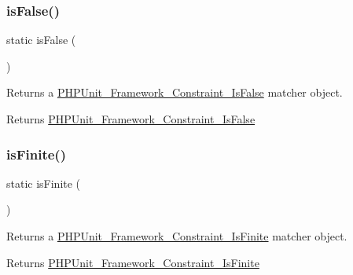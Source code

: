 \subsubsection{\texorpdfstring{is\+False()}{isFalse()}}
{\footnotesize\ttfamily static is\+False (\begin{DoxyParamCaption}{ }\end{DoxyParamCaption})\hspace{0.3cm}{\ttfamily [static]}}

Returns a \mbox{\hyperlink{class_p_h_p_unit___framework___constraint___is_false}{P\+H\+P\+Unit\+\_\+\+Framework\+\_\+\+Constraint\+\_\+\+Is\+False}} matcher object.

\begin{DoxyReturn}{Returns}
\mbox{\hyperlink{class_p_h_p_unit___framework___constraint___is_false}{P\+H\+P\+Unit\+\_\+\+Framework\+\_\+\+Constraint\+\_\+\+Is\+False}} 
\end{DoxyReturn}
\mbox{\label{class_p_h_p_unit___framework___assert_a991e411ffff9642316db83969d8ffc20}} 
\subsubsection{\texorpdfstring{is\+Finite()}{isFinite()}}
{\footnotesize\ttfamily static is\+Finite (\begin{DoxyParamCaption}{ }\end{DoxyParamCaption})\hspace{0.3cm}{\ttfamily [static]}}

Returns a \mbox{\hyperlink{class_p_h_p_unit___framework___constraint___is_finite}{P\+H\+P\+Unit\+\_\+\+Framework\+\_\+\+Constraint\+\_\+\+Is\+Finite}} matcher object.

\begin{DoxyReturn}{Returns}
\mbox{\hyperlink{class_p_h_p_unit___framework___constraint___is_finite}{P\+H\+P\+Unit\+\_\+\+Framework\+\_\+\+Constraint\+\_\+\+Is\+Finite}} 
\end{DoxyReturn}
\mbox{\label{class_p_h_p_unit___framework___assert_ac8cfcd770d31fd4f4dfb7c2a6111fe73}} 
